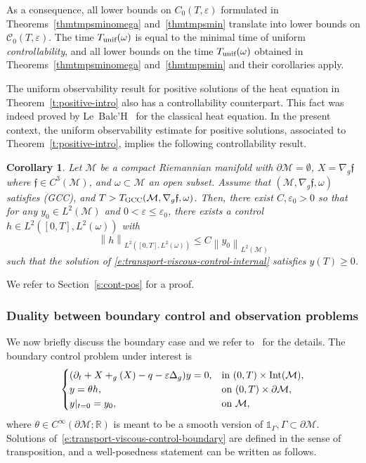 \documentclass[JEP,XML,SOM,Unicode]{cedram}
\newcommand{\GCC}{\textup{GCC}}
\newcommand{\pGCC}{\textup{(GCC)}\xspace}
\newcommand{\unif}{\textup{unif}}
\newtheorem{corollary}[lemma]{Corollary}
\theoremstyle{definition}
\newcommand{\M}{\ensuremath{\mathcal M}}
\newcommand{\calC}{\ensuremath{\mathcal C}}
\newcommand{\mb}[1]{\ensuremath{\mathbb{#1}}}
\newcommand{\R}{{\mb{R}}}
\newcommand{\f}{\ensuremath{\mathfrak{f}}}
\DeclareMathOperator{\Int}{Int}
\let \div \relax
\DeclareMathOperator{\div}{div}
\newcommand\nor[2]{\left\|#1\right\|_{#2}}
\let\d\partial
\let\e\varepsilon
\let\eps\varepsilon
\let\q q
\begin{document}
As a consequence, all lower bounds on $C_0(T,\eps)$ formulated in Theorems~\ref{thmtmpsminomega} and~\ref{thmtmpsmin} translate into lower bounds on $\calC_0(T,\eps)$. The time $T_{\unif}(\omega)$ is equal to the minimal time of uniform {\em controllability}, and all lower bounds on the time $T_{\unif}(\omega)$ obtained in Theorems~\ref{thmtmpsminomega} and~\ref{thmtmpsmin} and their corollaries apply.

The uniform observability result for positive solutions of the heat equation in Theorem~\ref{t:positive-intro} also has a controllability counterpart.
This fact was indeed proved by Le~Balc'H~\cite[Th.\,4.1]{L:18} for the classical heat equation.
In the present context, the uniform observability estimate for positive solutions, associated to Theorem~\ref{t:positive-intro}, implies the following controllability result.
\begin{corollary}
\label{corcontrol+}
Let $\M$ be a compact Riemannian manifold with $\d\M=\emptyset$, $X=\nabla_{g} \f$ where $\f\in C^{3}(\M)$, and $\omega\subset \M$ an open subset. Assume that $(\M, \nabla_{g} \f,\omega)$ satisfies \pGCC, and $T>T_{\GCC}(\M, \nabla_{g} \f,\omega)$. Then, there exist $C,\e_0>0$ so that for any $y_{0}\in L^{2}(\M)$ and $0<\e\leq \e_{0}$, there exists a control $h\in L^2([0,T],L^2(\omega))$ with
\[
\nor{h}{L^2([0,T],L^2(\omega))}\leq C\nor{y_{0}}{L^{2}(\M)}
\]
such that the solution of \eqref{e:transport-viscous-control-internal} satisfies $y(T)\geq0$.
\end{corollary}
We refer to Section~\ref{s:cont-pos} for a proof.

\subsubsection{Duality between boundary control and observation problems}
\label{s:boundary-shit}
We now briefly discuss the boundary case and we refer to~\cite{GL:07} for the details.
The boundary control problem under interest is
\begin{equation}
\label{e:transport-viscous-control-boundary}
\begin{cases}
(\d_t + X + \div_{g}(X) -\q - \eps \Delta_g ) y = 0, & \text{in } (0,T)\times \Int( \M), \\
y = \theta h, & \text{on } (0,T)\times \d\M, \\
y|_{t=0} = y_0, & \text{on } \M,
\end{cases}
\end{equation}
where $\theta \in C^\infty(\d\M ; \R)$ is meant to be a smooth version of $\mathds{1}_\Gamma, \Gamma \subset \d\M$.
Solutions of~\eqref{e:transport-viscous-control-boundary} are defined in the sense of transposition, and a well-posedness statement can be written as follows.
\end{document}
